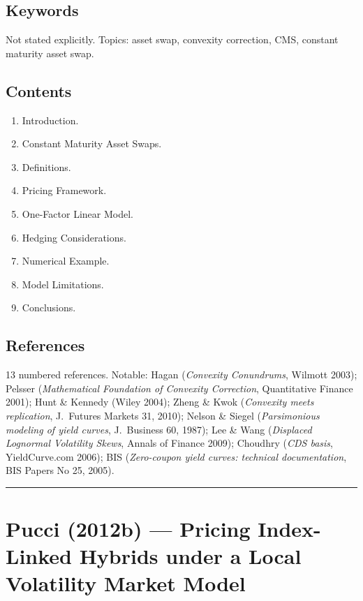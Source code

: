 \documentclass[11pt,a4paper]{article}
\begin{document}
\subsection*{Keywords}
Not stated explicitly. Topics: asset swap, convexity correction, CMS, constant maturity asset swap.

\subsection*{Contents}
\begin{enumerate}[noitemsep]
  \item Introduction.
  \item Constant Maturity Asset Swaps.
  \item Definitions.
  \item Pricing Framework.
  \item One-Factor Linear Model.
  \item Hedging Considerations.
  \item Numerical Example.
  \item Model Limitations.
  \item Conclusions.
\end{enumerate}

\subsection*{References}
13 numbered references. Notable: Hagan (\emph{Convexity Conundrums}, Wilmott 2003); Pelsser (\emph{Mathematical Foundation of Convexity Correction}, Quantitative Finance 2001); Hunt \& Kennedy (Wiley 2004); Zheng \& Kwok (\emph{Convexity meets replication}, J.\ Futures Markets 31, 2010); Nelson \& Siegel (\emph{Parsimonious modeling of yield curves}, J.\ Business 60, 1987); Lee \& Wang (\emph{Displaced Lognormal Volatility Skews}, Annals of Finance 2009); Choudhry (\emph{CDS basis}, YieldCurve.com 2006); BIS (\emph{Zero-coupon yield curves: technical documentation}, BIS Papers No 25, 2005).

\bigskip\hrule\bigskip

\section{Pucci (2012b) --- Pricing Index-Linked Hybrids under a Local Volatility Market Model}
\label{bib:pucci-2012-hybrid}
\end{document}
